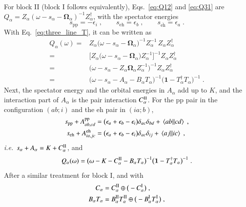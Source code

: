 \documentclass[aip,jcp,reprint,noshowkeys,superscriptaddress]{revtex4-1}
\newcommand{\ie}{\textit{i.e.}}
\newcommand{\bI}{\boldsymbol{1}}
\newcommand{\eps}{\epsilon}
\newcommand{\eh}{\text{eh}}
\newcommand{\teh}{\overline{\text{eh}}}
\newcommand{\pp}{\text{pp}}
\begin{document}
For block II (block I follows equivalently),
Eqs.~\eqref{eq:Q12} and \eqref{eq:Q31} are
$Q_\alpha=Z_\alpha(\omega-s_\alpha-\boldsymbol\Omega_\alpha)^{-1}Z_\alpha^\dagger$,
with the spectator energies
\begin{equation}
s_{\pp}=-\eps_i \;,
\qquad
s_{\eh}=\eps_b \;,
\qquad
s_{\teh}=\eps_a \;.
\label{eq:s_alpha}
\end{equation}
With Eq.~\eqref{eq:three_line_T}, it can be written as
\begin{equation}
\begin{aligned}
Q_\alpha(\omega)
={}&
Z_\alpha\big(\omega-s_\alpha-\boldsymbol\Omega_\alpha\big)^{-1}Z_\alpha^{-1}
\,Z_\alpha Z_\alpha^\dagger
\\
={}&
\big[Z_\alpha\big(\omega-s_\alpha-\boldsymbol\Omega_\alpha\big)Z_\alpha^{-1}\big]^{-1}
Z_\alpha Z_\alpha^\dagger
\\
={}&
\big(\omega-s_\alpha-Z_\alpha\boldsymbol\Omega_\alpha Z_\alpha^{-1}\big)^{-1}
Z_\alpha Z_\alpha^\dagger
\\
={}&
\big(\omega-s_\alpha-A_\alpha-B_\alpha T_\alpha\big)^{-1}
\big(\bI-T_\alpha^\dagger T_\alpha\big)^{-1} \;.
\end{aligned}
\label{eq:Q_blockII_T}
\end{equation}
Next, the spectator energy and the orbital energies in
$A_\alpha$ add
up to $K$, and the interaction part of $A_\alpha$ is the pair
interaction $C^{\rm II}_\alpha$. For the $\pp$ pair in the configuration
$(ab;i)$ and the $\eh$ pair in $(ia;b)$,
\begin{equation}
\begin{aligned}
s_{\pp}+A^{\pp}_{ab,cd}
&=
\big(\eps_a+\eps_b-\eps_i\big)\delta_{ac}\delta_{bd}+\mel{ab}{}{cd} \;,
\\
s_{\eh}+A^{\eh}_{ia,jc}
&=
\big(\eps_a+\eps_b-\eps_i\big)\delta_{ac}\delta_{ij}+\mel{aj}{}{ic} \;,
\end{aligned}
\nonumber
\end{equation}
\ie\ $s_\alpha+A_\alpha=K+C^{\rm II}_\alpha$, and
\begin{equation}
Q_\alpha(\omega)
=
\big(\omega-K-C^{\rm II}_\alpha-B_\alpha T_\alpha\big)^{-1}
\big(\bI-T_\alpha^\dagger T_\alpha\big)^{-1} \;.
\nonumber
\end{equation}
After a similar treatment for block I, and with
\begin{equation}
\begin{aligned}
C_\alpha
={}&
C^{\rm II}_\alpha\oplus\big(-C^{\rm I}_\alpha\big) \;,
\\
B_\alpha T_\alpha
={}&
B_\alpha^{\rm II}T_\alpha^{\rm II}\oplus
\big(-B_\alpha^{\rm I}T_\alpha^{\rm I}\big) \;,
\end{aligned}
\label{eq:CB_blocks}
\end{equation}
\end{document}
